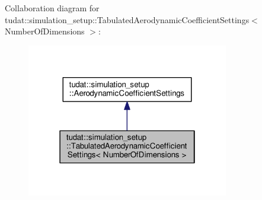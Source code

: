 Collaboration diagram for tudat\+:\+:simulation\+\_\+setup\+:\+:Tabulated\+Aerodynamic\+Coefficient\+Settings$<$ Number\+Of\+Dimensions $>$\+:
\nopagebreak
\begin{figure}[H]
\begin{center}
\leavevmode
\includegraphics[width=250pt]{classtudat_1_1simulation__setup_1_1TabulatedAerodynamicCoefficientSettings__coll__graph}
\end{center}
\end{figure}
